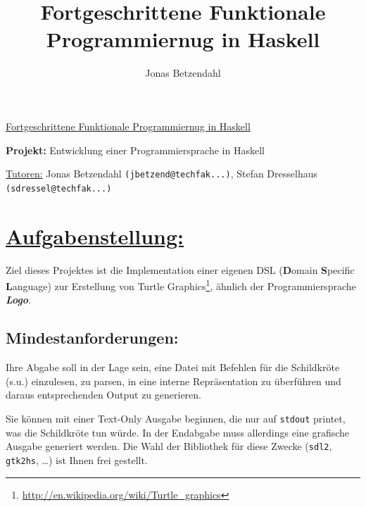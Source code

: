 \documentclass[10pt,a4paper]{article}
\author{Jonas Betzendahl}
\title{Fortgeschrittene Funktionale Programmiernug in Haskell}
\begin{document}
\huge \underline{Fortgeschrittene Funktionale Programmiernug in Haskell}\smallskip

\Large
\begin{center}
\textbf{Projekt:} Entwicklung einer Programmiersprache in Haskell\bigskip

\normalsize
\underline{Tutoren:}
Jonas Betzendahl \texttt{(jbetzend@techfak...)},
Stefan Dresselhaus \texttt{(sdressel@techfak...)}
\end{center}
\normalsize

\section*{\underline{Aufgabenstellung:}}

Ziel dieses Projektes ist die Implementation einer eigenen DSL (\textbf{D}omain \textbf{S}pecific \textbf{L}anguage) zur Erstellung von Turtle Graphics\footnote{\url{http://en.wikipedia.org/wiki/Turtle_graphics}}, ähnlich der Programmiersprache \emph{\textbf{Logo}}.

\subsection*{Mindestanforderungen:}

Ihre Abgabe soll in der Lage sein, eine Datei mit Befehlen für die Schildkröte (s.u.) einzulesen, zu parsen, in eine interne Repräsentation zu überführen und daraus entsprechenden Output zu generieren.\smallskip

Sie können mit einer Text-Only Ausgabe beginnen, die nur auf \texttt{stdout} printet, was die Schildkröte tun würde. In der Endabgabe muss allerdings eine grafische Ausgabe generiert werden. Die Wahl der Bibliothek für diese Zwecke (\texttt{sdl2}, \texttt{gtk2hs}, \dots) ist Ihnen frei gestellt.
\end{document}
